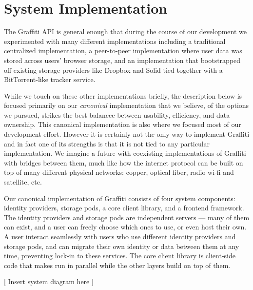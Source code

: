 \section{System Implementation}

The Graffiti API is general enough that during the course of our development
we experimented with many different implementations including
a traditional centralized implementation, a peer-to-peer implementation where user
data was stored across users' browser storage, and an implementation that
bootstrapped off existing storage providers like Dropbox and Solid
tied together with a BitTorrent-like tracker service.

While we touch on these other implementations briefly,
the description below is focused primarily on our \emph{canonical} implementation
that we believe, of the options we pursued, strikes
the best balancce between usability, efficiency, and data ownership.
This canonical implementation is also where we focused most of our development effort.
However it is certainly not the only way to implement Graffiti and
in fact one of its strengths is that it is not tied to any particular
implementation.
We imagine a future with coexisting implementations
of Graffiti with bridges between them, much like how the internet protocol
can be built on top of many different physical networks:
copper, optical fiber, radio wi-fi and satellite, etc.

Our canonical implementation of Graffiti consists of four system components:
identity providers, storage pods, a core client library, and a frontend framework.
The identity providers and storage pods are independent servers
--- many of them can exist, and a user can freely choose which ones to use, or even host their own.
A user interact seamlessly with users who use different identity providers and storage pods,
and can migrate their own identity or data between them at any time, preventing lock-in to these services.
The core client library is client-side code that makes
run in parallel while the other
layers build on top of them.

[ Insert system diagram here ]






